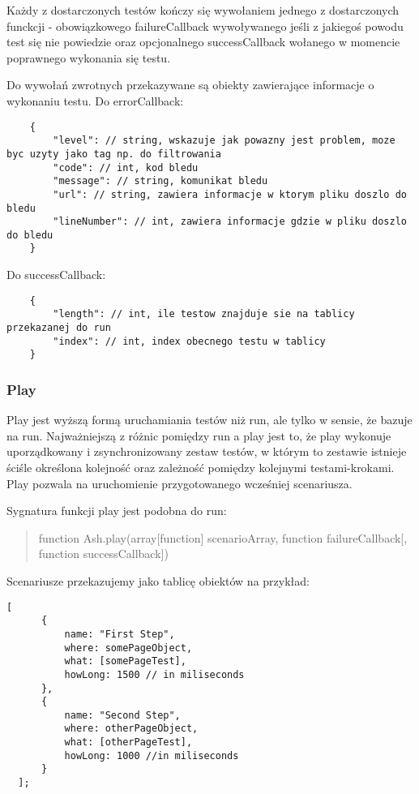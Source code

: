 \documentclass[brudnopis]{xmgr}
\begin{document}
Każdy z dostarczonych testów kończy się wywołaniem jednego z dostarczonych funckcji - obowiązkowego failureCallback wywoływanego jeśli z jakiegoś powodu test się nie powiedzie oraz opcjonalnego successCallback wołanego w momencie poprawnego wykonania się testu.

Do wywołań zwrotnych przekazywane są obiekty zawierające informacje o wykonaniu testu. Do errorCallback:

\begin{lstlisting}
	{
		"level": // string, wskazuje jak powazny jest problem, moze byc uzyty jako tag np. do filtrowania 
		"code": // int, kod bledu
		"message": // string, komunikat bledu 
		"url": // string, zawiera informacje w ktorym pliku doszlo do bledu 
		"lineNumber": // int, zawiera informacje gdzie w pliku doszlo do bledu
	}
\end{lstlisting}

Do successCallback: 

\begin{lstlisting}
	{
		"length": // int, ile testow znajduje sie na tablicy przekazanej do run 
		"index": // int, index obecnego testu w tablicy 
	}
\end{lstlisting}

\subsubsection{Play} 

Play jest wyższą formą uruchamiania testów niż run, ale tylko w sensie, że bazuje na run. Najważniejszą z różnic pomiędzy run a play jest to, że play wykonuje uporządkowany i zsynchronizowany zestaw testów, w którym to zestawie istnieje ściśle określona kolejność oraz zależność pomiędzy kolejnymi testami-krokami. Play pozwala na uruchomienie przygotowanego wcześniej scenariusza. 

Sygnatura funkcji play jest podobna do run:

\begin{quote}
function Ash.play(array[function] scenarioArray, function failureCallback[, function successCallback]) 
\end{quote}

Scenariusze przekazujemy jako tablicę obiektów na przykład:

\begin{lstlisting}
[
      {
          name: "First Step",
          where: somePageObject,
          what: [somePageTest],
          howLong: 1500	// in miliseconds
      },
      {
          name: "Second Step",
          where: otherPageObject,
          what: [otherPageTest],
          howLong: 1000	//in miliseconds
      }
  ];
\end{lstlisting}
\end{document}

